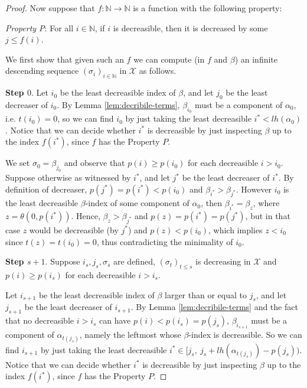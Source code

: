 \documentclass[10pt,a4paper]{amsart}
\newcommand\Nat{\mathbb{N}}
\begin{document}
\begin{proof}
Now suppose that $f:\Nat \to \Nat$ is a function with the following property:

\bigskip
{\em Property P}: For all $i\in \Nat$,
if $i$ is decreasible, then it is decreased by some $j \leq f(i)$. 

\bigskip
We first show that given such an $f$ we can compute (in $f$ and $\beta$) 
an infinite descending sequence $(\sigma_i)_{i\in\Nat}$ in $\mathcal{X}$ as follows. 

\medskip
{\bf Step $0$}.  
Let $i_0$ be the least decreasible index of $\beta$, and let $j_0$ be the least decreaser of $i_0$. By Lemma \ref{lem:decribile-terms}, $\beta_{i_0}$ must be a component of $\alpha_0$, i.e. $t(i_0) = 0$, so we can find $i_0$ by just taking the least decreasible $i^* < lh(\alpha_0)$. Notice that we can decide whether $i^*$ is decreasible by just inspecting $\beta$ up to the index $f(i^*)$, since $f$ has the Property $P$.

We set $\sigma_0 = \beta_{j_0}$ and observe that $p(i) \geq p(i_0)$ for each decreasible $i>i_0$. 
Suppose otherwise as witnessed by $i^*$, and let $j^*$ be the least decreaser of $i^*$. By definition of decreaser, $p(j^*) = p(i^*) < p(i_0)$ and $\beta_{i^*} > \beta_{j^*}$. However $i_0$ is the least decreasible $\beta$-index of some component of $\alpha_0$, then $\beta_{i^*} = \beta_z$, where $z = \theta(0,p(i^*))$. Hence, $\beta_z > \beta_{j^*}$ and $p(z)=p(i^*)=p(j^*)$, but in that case $z$ would be decreasible (by $j^*$) and $p(z) < p(i_0)$, which implies $z < i_0$ since $t(z)=t(i_0)=0$, thus contradicting the minimality of $i_0$.

\bigskip
{\bf Step $s+1$}. Suppose $i_s, j_s, \sigma_s$ are defined, $(\sigma_t)_{t \leq s}$ is decreasing in $\mathcal{X}$ and 
$p(i) \geq p(i_s)$ for each decreasible $i > i_s$. 

Let $i_{s+1}$ be the least decreasible index of $\beta$ larger than or equal to $j_s$, and let $j_{s+1}$ be the least decreaser of $i_{s+1}$. By Lemma \ref{lem:decribile-terms} and the fact that no decreasible $i > i_s$ can have $p(i) < p(i_s)=p(j_s)$, $\beta_{i_{s+1}}$ must be a component of $\alpha_{t(j_s)}$, namely the leftmost whose $\beta$-index is decreasible. So we can find $i_{s+1}$ 
by just taking the least decreasible $i^* \in [j_s,\ j_s + lh(\alpha_{t(j_s)}) - p(j_s))$. Notice that we can decide whether $i^*$ is decreasible by just inspecting $\beta$ up to the index $f(i^*)$, since $f$ has the Property $P$.


\end{proof}
\end{document}
